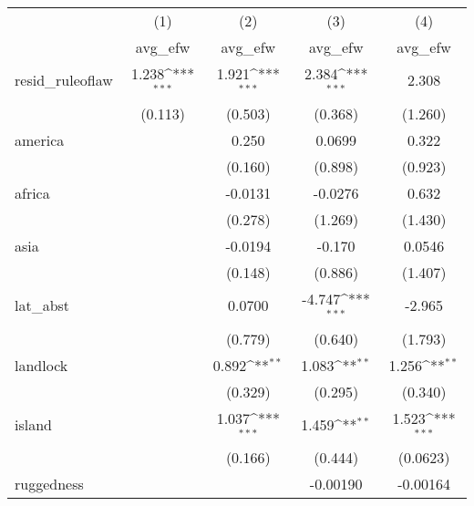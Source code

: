 {
\def\sym#1{\ifmmode^{#1}\else\(^{#1}\)\fi}
\begin{tabular}{l*{4}{c}}
\hline\hline
            &\multicolumn{1}{c}{(1)}&\multicolumn{1}{c}{(2)}&\multicolumn{1}{c}{(3)}&\multicolumn{1}{c}{(4)}\\
            &\multicolumn{1}{c}{avg\_efw}&\multicolumn{1}{c}{avg\_efw}&\multicolumn{1}{c}{avg\_efw}&\multicolumn{1}{c}{avg\_efw}\\
\hline
resid\_ruleoflaw&       1.238\sym{***}&       1.921\sym{***}&       2.384\sym{***}&       2.308         \\
            &     (0.113)         &     (0.503)         &     (0.368)         &     (1.260)         \\
[1em]
america     &                     &       0.250         &      0.0699         &       0.322         \\
            &                     &     (0.160)         &     (0.898)         &     (0.923)         \\
[1em]
africa      &                     &     -0.0131         &     -0.0276         &       0.632         \\
            &                     &     (0.278)         &     (1.269)         &     (1.430)         \\
[1em]
asia        &                     &     -0.0194         &      -0.170         &      0.0546         \\
            &                     &     (0.148)         &     (0.886)         &     (1.407)         \\
[1em]
lat\_abst    &                     &      0.0700         &      -4.747\sym{***}&      -2.965         \\
            &                     &     (0.779)         &     (0.640)         &     (1.793)         \\
[1em]
landlock    &                     &       0.892\sym{**} &       1.083\sym{**} &       1.256\sym{**} \\
            &                     &     (0.329)         &     (0.295)         &     (0.340)         \\
[1em]
island      &                     &       1.037\sym{***}&       1.459\sym{**} &       1.523\sym{***}\\
            &                     &     (0.166)         &     (0.444)         &    (0.0623)         \\
[1em]
ruggedness  &                     &                     &    -0.00190         &    -0.00164         \\

\end{tabular}}

